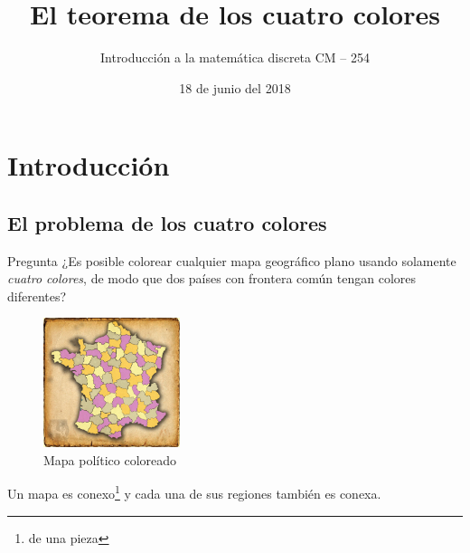 \documentclass[spanish,utf8]{beamer}
\title[Teorema de los cuatro colores]{\Huge\sffamily El teorema de los cuatro colores}
\subtitle{Introducción a la matemática discreta CM -- 254}
\author[Grupo N$^\circ6$]{%
	\texorpdfstring{%
		\begin{columns}
			\column{.3\linewidth}
			\centering
			C. Aznarán Laos %
			\column{.3\linewidth}
			\centering
			F. Cruz Ordoñez %
		\end{columns}
		\vspace{12pt}
		\begin{columns}
			\column{.3\linewidth}
			\centering
			G. Quiroz Gómez %
			\column{.3\linewidth}
			\centering
			J. Navío Torres %
		\end{columns}
	}
	{Author 1, Author 2, Author 3}
}
\institute[FC -- UNI]{\large%
	Facultad de Ciencias \and%
	Universidad Nacional de Ingeniería
}
\date{18 de junio del 2018}
\theoremstyle{definition}
\begin{document}
\begin{frame}[plain]
\maketitle
\end{frame}

\section{Introducción}

\begin{frame}{\contentsname}\transblindsvertical
\tableofcontents
\end{frame}

\subsection{El problema de los cuatro colores}


\begin{frame}{\insertsubsection}\transblindsvertical

\begin{alertblock}{Pregunta} %
	¿Es posible colorear cualquier mapa geográfico plano usando solamente \emph{cuatro colores}, de modo que dos países con frontera común tengan colores diferentes? 
\end{alertblock}

\pause

\begin{minipage}[c]{6cm}
	\begin{figure}
		\centering
		\includegraphics[width=4cm]{mapa-4-colores_HR.jpg}
		\caption{Mapa político coloreado}
	\end{figure}
\end{minipage}
\begin{minipage}[c]{5cm}
	\begin{definition}
		Un mapa es conexo\footnote{de una pieza} y cada una de sus regiones también es conexa.
	\end{definition}
\end{minipage}
\end{frame}
\end{document}

